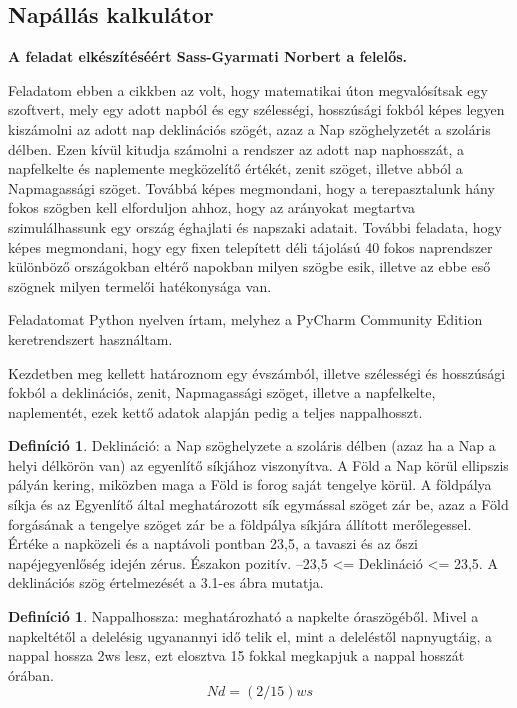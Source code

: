 \documentclass[
]{thesis-ekf}
\theoremstyle{definition}
\newtheorem{definicio}[tetel]{Definíció}
\theoremstyle{remark}
\begin{document}
		\subsection{Napállás kalkulátor}
			\textbf{A feladat elkészítéséért Sass-Gyarmati Norbert a felelős.} 
			\par Feladatom ebben a cikkben az volt, hogy matematikai úton megvalósítsak egy szoftvert, mely egy adott napból és egy szélességi, hosszúsági fokból képes legyen kiszámolni az adott nap deklinációs szögét, azaz a Nap szöghelyzetét a szoláris délben. Ezen kívül kitudja számolni a rendszer az adott nap naphosszát, a napfelkelte és naplemente megközelítő értékét, zenit szöget, illetve abból a Napmagassági szöget. Továbbá képes megmondani, hogy a terepasztalunk hány fokos szögben kell elforduljon ahhoz, hogy az arányokat megtartva szimulálhassunk egy ország éghajlati és napszaki adatait. További feladata, hogy képes megmondani, hogy egy fixen telepített déli tájolású 40 fokos naprendszer különböző országokban eltérő napokban milyen szögbe esik, illetve az ebbe eső szögnek milyen termelői hatékonysága van.
			\par Feladatomat Python nyelven írtam, melyhez a PyCharm Community Edition keretrendszert használtam. 
			\par Kezdetben meg kellett határoznom egy évszámból, illetve szélességi és hosszúsági fokból a deklinációs, zenit, Napmagassági szöget, illetve a napfelkelte, naplementét, ezek kettő adatok alapján pedig a teljes nappalhosszt. 
			
			\begin{definicio}
				Deklináció: a Nap szöghelyzete a szoláris délben (azaz ha a Nap a helyi délkörön van) az egyenlítő síkjához viszonyítva. A Föld a Nap körül ellipszis pályán kering, miközben maga a Föld is forog saját tengelye körül. A földpálya síkja és az Egyenlítő által meghatározott sík egymással szöget zár be, azaz a Föld forgásának a tengelye szöget zár be a földpálya síkjára állított merőlegessel. Értéke a napközeli és a naptávoli pontban 23,5, a tavaszi és az őszi napéjegyenlőség idején zérus. Északon pozitív. –23,5 <=  Deklináció <= 23,5. A deklinációs szög értelmezését a 3.1-es ábra mutatja.
			
				\cite{Kornyezet}
			\end{definicio}
			\begin{definicio}
				Nappalhossza: meghatározható a napkelte óraszögéből. Mivel a napkeltétől a delelésig ugyanannyi idő telik el, mint a deleléstől napnyugtáig, a nappal hossza 2ws lesz, ezt elosztva 15 fokkal megkapjuk a nappal hosszát órában.
				\[Nd = (2/15) ws\]
				\cite{Kornyezet}
			\end{definicio}
\end{document}
